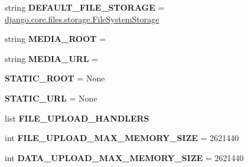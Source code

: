 \begin{DoxyCompactItemize}
\mbox{\label{namespacedjango_1_1conf_1_1global__settings_a7a065f4fa6d947fea0d2d441e525729b}} 
string {\bfseries D\+E\+F\+A\+U\+L\+T\+\_\+\+F\+I\+L\+E\+\_\+\+S\+T\+O\+R\+A\+GE} = \textquotesingle{}\mbox{\hyperlink{classdjango_1_1core_1_1files_1_1storage_1_1_file_system_storage}{django.\+core.\+files.\+storage.\+File\+System\+Storage}}\textquotesingle{}
\item 
\mbox{\label{namespacedjango_1_1conf_1_1global__settings_ad2f49cd181d02cd8e9bd33d5a19cc207}} 
string {\bfseries M\+E\+D\+I\+A\+\_\+\+R\+O\+OT} = \textquotesingle{}\textquotesingle{}
\item 
\mbox{\label{namespacedjango_1_1conf_1_1global__settings_a03ace1cb4f37a288415421369b010ba2}} 
string {\bfseries M\+E\+D\+I\+A\+\_\+\+U\+RL} = \textquotesingle{}\textquotesingle{}
\item 
\mbox{\label{namespacedjango_1_1conf_1_1global__settings_a06095a5a945397504ee216c096076820}} 
{\bfseries S\+T\+A\+T\+I\+C\+\_\+\+R\+O\+OT} = None
\item 
\mbox{\label{namespacedjango_1_1conf_1_1global__settings_abcbf7c5c7804e499c239fc8a326caf45}} 
{\bfseries S\+T\+A\+T\+I\+C\+\_\+\+U\+RL} = None
\item 
list {\bfseries F\+I\+L\+E\+\_\+\+U\+P\+L\+O\+A\+D\+\_\+\+H\+A\+N\+D\+L\+E\+RS}
\item 
\mbox{\label{namespacedjango_1_1conf_1_1global__settings_a9283d3335df343164a4479e78d25c5ca}} 
int {\bfseries F\+I\+L\+E\+\_\+\+U\+P\+L\+O\+A\+D\+\_\+\+M\+A\+X\+\_\+\+M\+E\+M\+O\+R\+Y\+\_\+\+S\+I\+ZE} = 2621440
\item 
\mbox{\label{namespacedjango_1_1conf_1_1global__settings_a17ebfe8a87e04e35010b56ecad31ee2f}} 
int {\bfseries D\+A\+T\+A\+\_\+\+U\+P\+L\+O\+A\+D\+\_\+\+M\+A\+X\+\_\+\+M\+E\+M\+O\+R\+Y\+\_\+\+S\+I\+ZE} = 2621440
\item 
\mbox{\label{namespacedjango_1_1conf_1_1global__settings_af8a6b1c0604c89345d252928ede814fc}} 

\end{DoxyCompactItemize}
